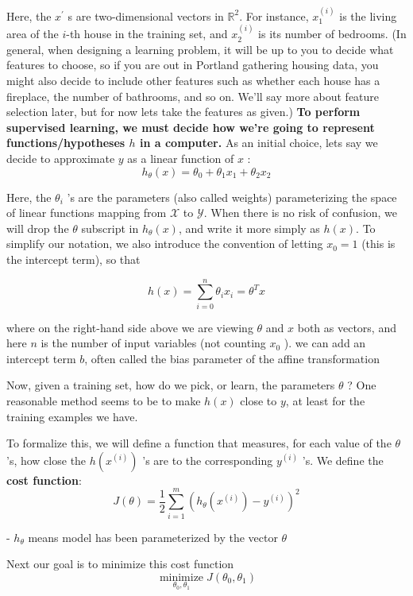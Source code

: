 \documentclass[openany]{book}
\begin{document}
Here, the $x^{\prime}$ s are two-dimensional vectors in $\mathbb{R}^{2}$. For instance, $x_{1}^{(i)}$ is the living area of the $i$-th house in the training set, and $x_{2}^{(i)}$ is its number of bedrooms. (In general, when designing a learning problem, it will be up to you to decide what features to choose, so if you are out in Portland gathering housing data, you might also decide to include other features such as whether each house has a fireplace, the number of bathrooms, and so on. We'll say more about feature selection later, but for now lets take the features as given.)
\textbf{To perform supervised learning, we must decide how we're going to represent functions/hypotheses $h$ in a computer. }As an initial choice, lets say we decide to approximate $y$ as a linear function of $x$ :
$$
h_{\theta}(x)=\theta_{0}+\theta_{1} x_{1}+\theta_{2} x_{2}
$$

Here, the $\theta_{i}$ 's are the parameters (also called weights) parameterizing the space of linear functions mapping from $\mathcal{X}$ to $\mathcal{Y}$. When there is no risk of confusion, we will drop the $\theta$ subscript in $h_{\theta}(x)$, and write it more simply as $h(x)$. To simplify our notation, we also introduce the convention of letting $x_{0}=1$ (this is the intercept term), so that

$$
h(x)=\sum_{i=0}^{n} \theta_{i} x_{i}=\theta^{T} x
$$

where on the right-hand side above we are viewing $\theta$ and $x$ both as vectors, and here $n$ is the number of input variables (not counting $x_{0}$ ). we can add an intercept term $b$, often called the bias parameter of the affine transformation 

Now, given a training set, how do we pick, or learn, the parameters $\theta$ ? One reasonable method seems to be to make $h(x)$ close to $y$, at least for the training examples we have.
 
To formalize this, we will define a function that measures, for each value of the $\theta$ 's, how close the $h\left(x^{(i)}\right)$ 's are to the corresponding $y^{(i)}$ 's. We define the \textbf{cost function}:
$$
J(\theta)=\frac{1}{2} \sum_{i=1}^{m}\left(h_{\theta}\left(x^{(i)}\right)-y^{(i)}\right)^{2}
$$

- $h_{\theta}$ means model has been parameterized by the vector $\theta$

Next our goal is to minimize this cost function
$$
\underset{\theta_{0}, \theta_{1}}{\operatorname{minimize}} J\left(\theta_{0}, \theta_{1}\right)
$$
\end{document}
